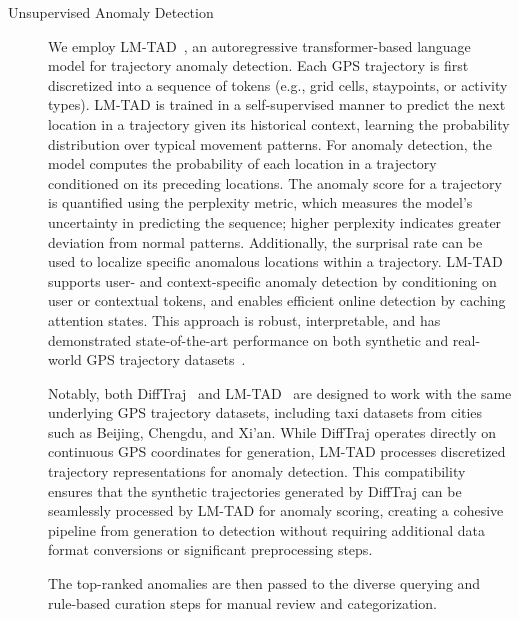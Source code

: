 \documentclass[runningheads]{llncs}
\begin{document}
\begin{description}
    \item[Unsupervised Anomaly Detection]  
    We employ LM-TAD~\cite{mbuyaTrajectoryAnomalyDetection2024}, an autoregressive transformer-based language model for trajectory anomaly detection. Each GPS trajectory is first discretized into a sequence of tokens (e.g., grid cells, staypoints, or activity types). LM-TAD is trained in a self-supervised manner to predict the next location in a trajectory given its historical context, learning the probability distribution over typical movement patterns. For anomaly detection, the model computes the probability of each location in a trajectory conditioned on its preceding locations. The anomaly score for a trajectory is quantified using the perplexity metric, which measures the model's uncertainty in predicting the sequence; higher perplexity indicates greater deviation from normal patterns. Additionally, the surprisal rate can be used to localize specific anomalous locations within a trajectory. LM-TAD supports user- and context-specific anomaly detection by conditioning on user or contextual tokens, and enables efficient online detection by caching attention states. This approach is robust, interpretable, and has demonstrated state-of-the-art performance on both synthetic and real-world GPS trajectory datasets~\cite{mbuyaTrajectoryAnomalyDetection2024}. 
    
    Notably, both DiffTraj~\cite{zhuDiffTrajGeneratingGPS2023} and LM-TAD~\cite{mbuyaTrajectoryAnomalyDetection2024} are designed to work with the same underlying GPS trajectory datasets, including taxi datasets from cities such as Beijing, Chengdu, and Xi'an. While DiffTraj operates directly on continuous GPS coordinates for generation, LM-TAD processes discretized trajectory representations for anomaly detection. This compatibility ensures that the synthetic trajectories generated by DiffTraj can be seamlessly processed by LM-TAD for anomaly scoring, creating a cohesive pipeline from generation to detection without requiring additional data format conversions or significant preprocessing steps.
    
    The top-ranked anomalies are then passed to the diverse querying and rule-based curation steps for manual review and categorization.
    

\end{description}
\end{document}
